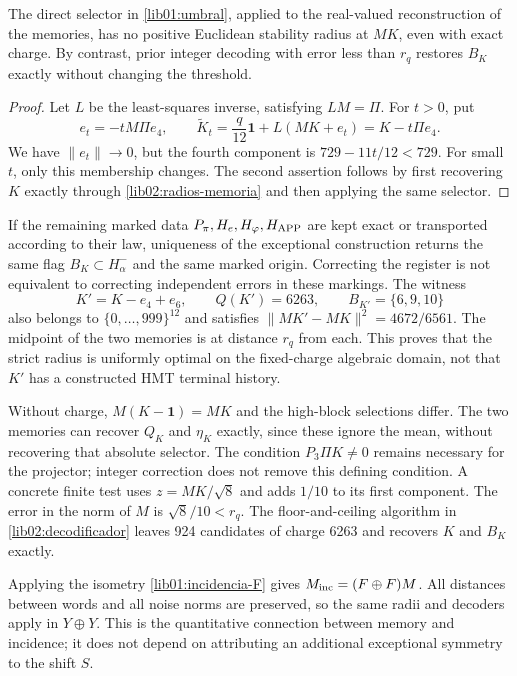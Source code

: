 \begin{proposition}
\label{lib01:umbral-estable}
The direct selector in \eqref{lib01:umbral}, applied to the real-valued reconstruction of the memories, has no positive Euclidean stability radius at \(MK\), even with exact charge. By contrast, prior integer decoding with error less than \(r_q\) restores \(B_K\) exactly without changing the threshold.
\end{proposition}
\begin{proof}
Let \(L\) be the least-squares inverse, satisfying \(LM=\Pi\). For \(t>0\), put
\[
 e_t=-tM\Pi e_4,
 \qquad \widetilde K_t=\frac q{12}\mathbf1+L(MK+e_t)
 =K-t\Pi e_4.
\]
We have \(\|e_t\|\to0\), but the fourth component is \(729-11t/12<729\). For small \(t\), only this membership changes. The second assertion follows by first recovering \(K\) exactly through \cref{lib02:radios-memoria} and then applying the same selector.
\end{proof}

If the remaining marked data \(P_\pi,H_e,H_\varphi,H_{\rm APP}\) are kept exact or transported according to their law, uniqueness of the exceptional construction returns the same flag \(B_K\subset H^-_\alpha\) and the same marked origin. Correcting the register is not equivalent to correcting independent errors in these markings. The witness
\[
 K'=K-e_4+e_6,
 \qquad Q(K')=6263,\qquad B_{K'}=\{6,9,10\}
\]
also belongs to \(\{0,\ldots,999\}^{12}\) and satisfies \(\|MK'-MK\|^2=4672/6561\). The midpoint of the two memories is at distance \(r_q\) from each. This proves that the strict radius is uniformly optimal on the fixed-charge algebraic domain, not that \(K'\) has a constructed HMT terminal history.

Without charge, \(M(K-\mathbf1)=MK\) and the high-block selections differ. The two memories can recover \(Q_K\) and \(\eta_K\) exactly, since these ignore the mean, without recovering that absolute selector. The condition \(P_3\Pi K\ne0\) remains necessary for the projector; integer correction does not remove this defining condition. A concrete finite test uses \(z=MK/\sqrt8\) and adds \(1/10\) to its first component. The error in the norm of \(M\) is \(\sqrt8/10<r_q\). The floor-and-ceiling algorithm in \cref{lib02:decodificador} leaves 924 candidates of charge 6263 and recovers \(K\) and \(B_K\) exactly.

Applying the isometry \eqref{lib01:incidencia-F} gives \(M_{\rm inc}=(F\oplus F)M\). All distances between words and all noise norms are preserved, so the same radii and decoders apply in \(Y\oplus Y\). This is the quantitative connection between memory and incidence; it does not depend on attributing an additional exceptional symmetry to the shift \(S\).

